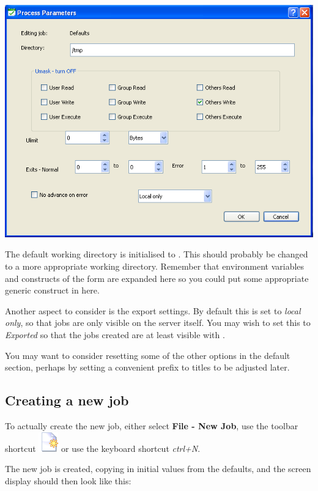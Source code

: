 \includegraphics{img/btrwdefppdlg.png}

The default working directory is initialised to . This should probably be
changed to a more appropriate working directory. Remember that environment variables
and constructs of the form  are expanded here so you could
put some appropriate generic construct in here.

Another aspect to consider is the export settings. By default this is set to
\textit{local only}, so that jobs are only visible on the server itself. You may
wish to set this to \textit{Exported} so that the jobs created are at least visible
with .

You may want to consider resetting some of the other options in the default section, perhaps by
setting a convenient prefix to titles to be adjusted later.

\subsection{Creating a new job}

To actually create the new job, either select \textbf{File - New Job}, use the toolbar shortcut
\includegraphics{img/btrwnewjob.png} or use the keyboard shortcut \textit{ctrl+N}.

The new job is created, copying in initial values from the defaults, and the screen display should then
look like this:

